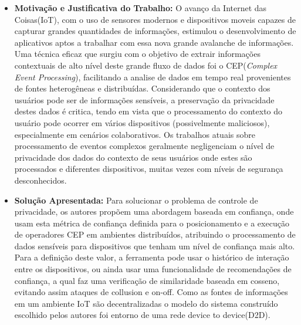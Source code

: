 \documentclass[tid,table]{texufpel} %
\begin{document}
\begin{itemize}
	\item \textbf{Motivação e Justificativa do Trabalho:} O avanço da Internet das Coisas(IoT), com o uso de sensores modernos e dispositivos moveis capazes de capturar grandes quantidades de informações, estimulou o desenvolvimento de aplicativos aptos a trabalhar com essa nova grande avalanche de informações. Uma técnica eficaz que surgiu com o objetivo de extrair informações contextuais de alto nível deste grande fluxo de dados foi o CEP(\textit{Complex Event Processing}), facilitando a analise de dados em tempo real provenientes de fontes heterogêneas e distribuídas. Considerando que o contexto dos usuários pode ser de informações sensíveis, a preservação da privacidade destes dados é critica, tendo em vista que o processamento do contexto do usuário pode ocorrer em vários dispositivos (possivelmente maliciosos), especialmente em cenários colaborativos. Os trabalhos atuais sobre processamento de eventos complexos geralmente negligenciam o nível de privacidade dos dados do contexto de seus usuários onde estes são processados e diferentes dispositivos, muitas vezes com níveis de segurança desconhecidos. 
	
	
	\item \textbf{Solução Apresentada:} Para solucionar o problema de controle de privacidade, os autores propõem uma abordagem baseada em confiança, onde usam esta métrica de confiança definida para o posicionamento e a execução de operadores CEP em ambientes distribuídos, atribuindo o processamento de dados sensíveis para dispositivos que tenham um nível de confiança mais alto. Para a definição deste valor, a ferramenta pode usar o histórico de interação entre os dispositivos, ou ainda usar uma funcionalidade de recomendações de confiança, a qual faz uma verificação de similaridade baseada em cosseno, evitando assim ataques de collusion e on-off. Como as fontes de informações em um ambiente IoT são decentralizadas o modelo do sistema construído escolhido pelos autores foi entorno de uma rede device to device(D2D).
	

\end{itemize}
\end{document}
